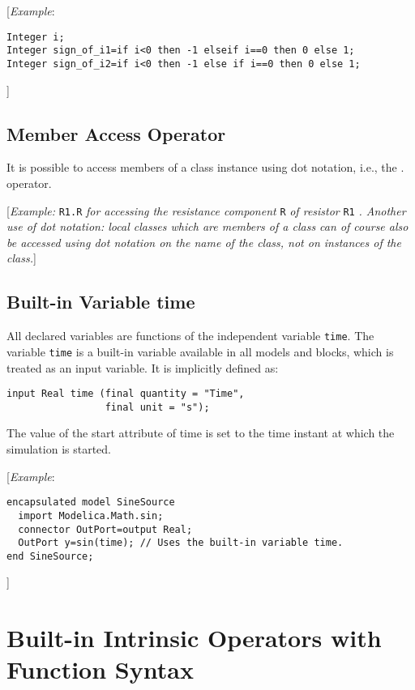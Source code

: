 {[}\emph{Example}:
\begin{lstlisting}[language=modelica]
Integer i;
Integer sign_of_i1=if i<0 then -1 elseif i==0 then 0 else 1;
Integer sign_of_i2=if i<0 then -1 else if i==0 then 0 else 1;
\end{lstlisting}
{]}

\subsection{Member Access Operator}

It is possible to access members of a class instance using dot notation,
i.e., the . operator.

{[}\emph{Example:} \lstinline!R1.R! \emph{for accessing the resistance component} \lstinline!R!
\emph{of resistor} \lstinline!R1! \emph{. Another use of dot notation: local classes
which are members of a class can of course also be accessed using dot
notation on the name of the class, not on instances of the class.}{]}

\subsection{Built-in Variable time}

All declared variables are functions of the independent variable \lstinline!time!.
The variable \lstinline!time! is a built-in variable available in all models and
blocks, which is treated as an input variable. It is implicitly defined
as:
\begin{lstlisting}[language=modelica]
input Real time (final quantity = "Time",
                 final unit = "s");
\end{lstlisting}

The value of the start attribute of time is set to the time instant at
which the simulation is started.

{[}\emph{Example}:
\begin{lstlisting}[language=modelica]
encapsulated model SineSource
  import Modelica.Math.sin;
  connector OutPort=output Real;
  OutPort y=sin(time); // Uses the built-in variable time.
end SineSource;
\end{lstlisting}
{]}

\section{Built-in Intrinsic Operators with Function Syntax}

